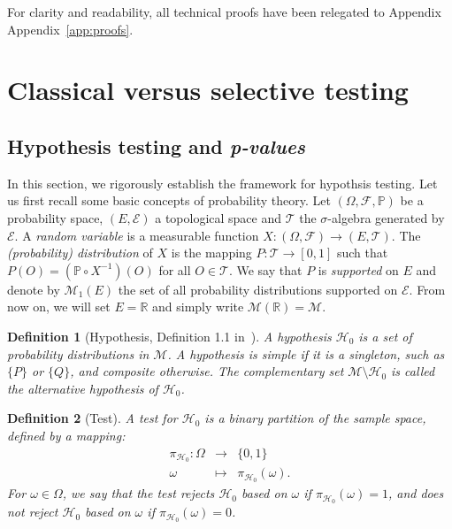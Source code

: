 \documentclass[a4paper,11pt]{article}
\theoremstyle{plain}
\newcommand{\1}{\mathbf{1}}
\newtheorem{definition}{Definition}
\begin{document}
For clarity and readability, all technical proofs have been relegated to Appendix Appendix~\ref{app:proofs}.

\section{Classical versus selective testing}\label{sec:testing}

\subsection{Hypothesis testing and \textit{p-values}}


In this section, we rigorously establish the framework for hypothsis testing. Let us first recall some basic concepts of probability theory. Let $(\Omega, \mathcal{F},\mathbb{P})$ be a probability space, $(E,\mathcal{E})$ a topological space and $\mathcal{T}$ the $\sigma$-algebra generated by $\mathcal{E}$. A \textit{random variable} is a measurable function $X:(\Omega,\mathcal{F})\rightarrow(E,\mathcal{T})$. The \textit{(probability) distribution} of $X$ is the mapping $P:\mathcal{T}\rightarrow[0,1]$ such that  $P(O) = (\mathbb{P}\circ X^{-1})(O)$ for all $O\in\mathcal{T}$. We say that $P$ is \textit{supported} on $E$ and denote by $\mathcal{M}_1(E)$ the set of all probability distributions supported on $\mathcal{E}$. From now on, we will set $E=\mathbb{R}$ and simply write $\mathcal{M}(\mathbb{R})=\mathcal{M}$.

\begin{definition}[Hypothesis, Definition 1.1 in~\cite{Ramdas}]\label{def_dominate_sto}
  A \textit{hypothesis} $\mathcal{H}_0$ is a set of probability distributions in $\mathcal{M}$.
  A hypothesis is \textit{simple} if it is a singleton, such as $\lbrace P \rbrace$ or $\lbrace Q \rbrace$, and \textit{composite} otherwise. The complementary set $\mathcal{M} \setminus \mathcal{H}_0$ is called the \textit{alternative hypothesis} of $\mathcal{H}_0$.
\end{definition}

\begin{definition}[Test]\label{def_test}
  A \textit{test} for $\mathcal{H}_0$ is a binary partition of the sample space, defined by a mapping:
 \begin{equation}
  \begin{array}{rcl}
    \pi_{\mathcal{H}_0} : \Omega &\to& \{0,1\} \\
    \omega &\mapsto& \pi_{\mathcal{H}_0}(\omega).
  \end{array}
 \end{equation}
 For $\omega \in \Omega$, we say that the test \textit{rejects}
 $\mathcal{H}_0$ based on $\omega$ if $\pi_{\mathcal{H}_0}(\omega)=1$, and \textit{does not reject}
  $\mathcal{H}_0$ based on $\omega$ if $\pi_{\mathcal{H}_0}(\omega)=0$.
\end{definition}
\end{document}
